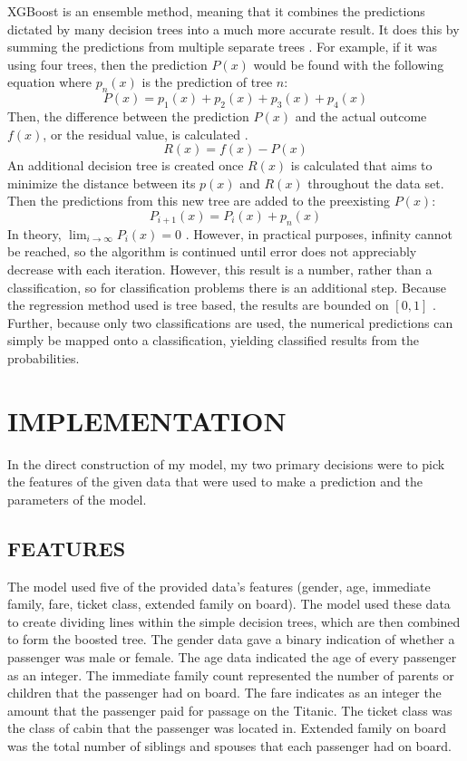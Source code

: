 \documentclass[12pt]{article}
\begin{document}
    XGBoost is an ensemble method, meaning that it combines the predictions dictated by many decision trees into a much more accurate result. It does this by summing the predictions from multiple separate trees \cite{three}. For example, if it was using four trees, then the prediction $P(x)$ would be found with the following equation where $p_{n}(x)$ is the prediction of tree $n$:
    \begin{equation}
      P(x) = p_{1}(x) + p_{2}(x) + p_{3}(x) + p_{4}(x)
    \end{equation}
    Then, the difference between the prediction $P(x)$ and the actual outcome $f(x)$, or the residual value, is calculated \cite{three}.
    \begin{equation}
      R(x) = f(x) - P(x)
    \end{equation}
    An additional decision tree is created once $R(x)$ is calculated that aims to minimize the distance between its $p(x)$
    and $R(x)$ throughout the data set. Then the predictions from this new tree are added to the preexisting $P(x)$:
      \begin{equation}
        P_{i+1}(x) = P_i(x) + p_n(x)
      \end{equation}
    In theory, $\lim_{i \to \infty} P_i(x) = 0$ \cite{mason2000boosting}. However, in practical purposes, infinity cannot be reached, so the algorithm is continued until error does not appreciably decrease with each iteration. However, this result is a number, rather than a classification, so for classification problems there is an additional step. Because the regression method used is tree based, the results are bounded on $[0,1]$ \cite{classificationexplanation}. Further, because only two classifications are used, the numerical predictions can simply be mapped onto a classification, yielding classified results from the probabilities.

  \section{IMPLEMENTATION}
    In the direct construction of my model, my two primary decisions were to pick the features of the given data that were used to make a prediction and the parameters of the model.
    \subsection{FEATURES}
      The model used five of the provided data's features (gender, age, immediate family, fare, ticket class, extended family on board). The model used these data to create dividing lines within the simple decision trees, which are then combined to form the boosted tree. The gender data gave a binary indication of whether a passenger was male or female. The age data indicated the age of every passenger as an integer. The immediate family count represented the number of parents or children that the passenger had on board. The fare indicates as an integer the amount that the passenger paid for passage on the Titanic. The ticket class was the class of cabin that the passenger was located in. Extended family on board was the total number of siblings and spouses that each passenger had on board.
\end{document}
